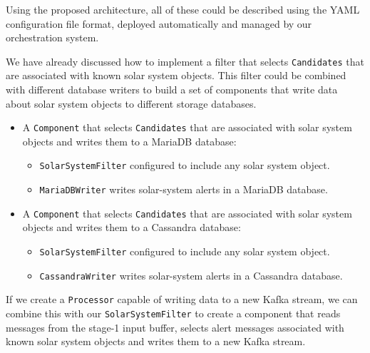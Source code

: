 \documentclass{article}
\newcommand{\yaml} {YAML\xspace}
\newcommand{\kafka} {Kafka\xspace}
\newcommand{\cassandra} {Cassandra\xspace}
\newcommand{\mariadb} {MariaDB\xspace}
\newcommand{\stageone} {stage-1\xspace}
\begin{document}
Using the proposed architecture, all of these could be described using the \yaml configuration file format, deployed automatically and managed by our orchestration system.

We have already discussed how to implement a filter that selects \texttt{Candidates} that are associated with known solar system objects. This filter could be combined with different database writers to build a set of components that write data about solar system objects to different storage databases.

\begin{itemize}
    \item A \texttt{Component} that selects \texttt{Candidates} that are associated with solar system objects and writes them to a \mariadb database:
    \begin{itemize}
        \item \texttt{SolarSystemFilter} configured to include any solar system object.
    \end{itemize}
    \begin{itemize}
        \item \texttt{MariaDBWriter} writes solar-system alerts in a \mariadb database.
    \end{itemize}
\end{itemize}

\begin{itemize}
    \item A \texttt{Component} that selects \texttt{Candidates} that are associated with solar system objects and writes them to a \cassandra database:
    \begin{itemize}
        \item \texttt{SolarSystemFilter} configured to include any solar system object.
    \end{itemize}
    \begin{itemize}
        \item \texttt{CassandraWriter} writes solar-system alerts in a \cassandra database.
    \end{itemize}
\end{itemize}

If we create a \texttt{Processor} capable of writing data to a new \kafka stream, we can combine this with our \texttt{SolarSystemFilter} to create a component that reads messages from the \stageone input buffer, selects alert messages associated with known solar system objects and writes them to a new \kafka stream.
\end{document}
